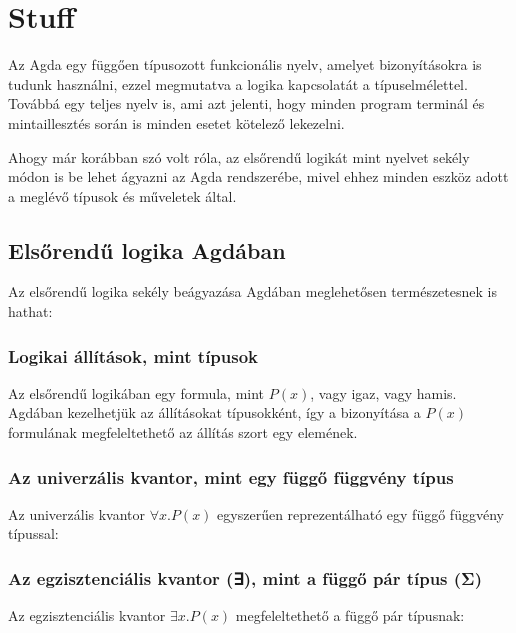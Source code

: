 \chapter{Stuff}
\label{ch:stuff}



Az Agda egy függően típusozott funkcionális nyelv, amelyet bizonyításokra is tudunk használni, ezzel megmutatva a logika kapcsolatát a típuselmélettel. Továbbá egy teljes nyelv is, ami azt jelenti, hogy minden program terminál és mintaillesztés során is minden esetet kötelező lekezelni.

Ahogy már korábban szó volt róla, az elsőrendű logikát mint nyelvet sekély módon is be lehet ágyazni az Agda rendszerébe, mivel ehhez minden eszköz adott a meglévő típusok és műveletek által.

\section{Elsőrendű logika Agdában}

Az elsőrendű logika sekély beágyazása Agdában meglehetősen természetesnek is hathat:

\subsection{Logikai állítások, mint típusok}

Az elsőrendű logikában egy formula, mint $ P(x) $, vagy igaz, vagy hamis. Agdában kezelhetjük az állításokat típusokként, így a bizonyítása a $ P(x) $ formulának megfeleltethető az állítás szort egy elemének.

\subsection{Az univerzális kvantor, mint egy függő függvény típus}

Az univerzális kvantor $ ∀ x. P(x) $ egyszerűen reprezentálható egy függő függvény típussal:

\miscUniversalQuantifier{}

\subsection{Az egzisztenciális kvantor (∃), mint a függő pár típus (Σ)}

Az egzisztenciális kvantor $ ∃ x. P(x) $ megfeleltethető a függő pár típusnak:

\miscExistentialQuantifier{}

